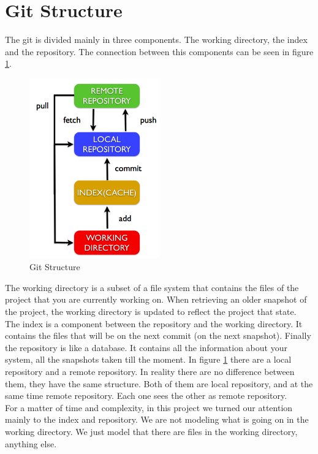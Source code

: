 \section{Git Structure}
The git is divided mainly in three components. The working directory,
the index and the repository. The connection between this components
can be seen in figure \ref{fig:git_structure}. 

\begin{figure}[h!]
   \centering
   \includegraphics[width=0.5\textwidth]{images/data_flow_simplified.png}
   \caption{Git Structure}\label{fig:git_structure}
\end{figure}

The working directory is a subset of
a file system that contains the files of the project that you are
currently working on. When retrieving an older snapshot of the project, the
working directory is updated to reflect the project that state. The index is a
component between the repository and the working directory. It
contains the files that will be on the next commit
(on the next snapshot). Finally the repository is like a database. It contains 
all the information about your system, all the snapshots taken till
the moment. In figure \ref{fig:git_structure} there are a local
repository and a remote repository. In reality there are no difference
between them, they have the same structure. Both of them are local
repository, and at the same time remote repository. Each one sees the 
other as remote repository.\\

For a matter of time and complexity, in this project we turned our attention 
mainly to the index and repository. We are not modeling what is going
on in the working directory. We just model that there are files in the
working directory, anything else.
